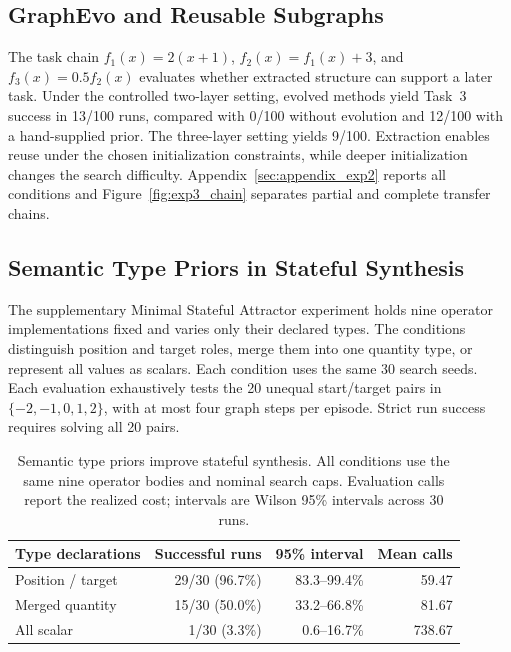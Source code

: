\subsection{GraphEvo and Reusable Subgraphs}
\label{subsec:graphevo_validation}
The task chain $f_1(x)=2(x+1)$, $f_2(x)=f_1(x)+3$, and $f_3(x)=0.5f_2(x)$ evaluates whether extracted structure can support a later task. Under the controlled two-layer setting, evolved methods yield Task~3 success in 13/100 runs, compared with 0/100 without evolution and 12/100 with a hand-supplied prior. The three-layer setting yields 9/100. Extraction enables reuse under the chosen initialization constraints, while deeper initialization changes the search difficulty. Appendix~\ref{sec:appendix_exp2} reports all conditions and Figure~\ref{fig:exp3_chain} separates partial and complete transfer chains.

\subsection{Semantic Type Priors in Stateful Synthesis}
\label{subsec:stateful_synthesis}
The supplementary Minimal Stateful Attractor experiment holds nine operator implementations fixed and varies only their declared types. The conditions distinguish position and target roles, merge them into one quantity type, or represent all values as scalars. Each condition uses the same 30 search seeds. Each evaluation exhaustively tests the 20 unequal start/target pairs in $\{-2,-1,0,1,2\}$, with at most four graph steps per episode. Strict run success requires solving all 20 pairs.

\begin{table}[t]
\centering
\caption{Semantic type priors improve stateful synthesis. All conditions use the same nine operator bodies and nominal search caps. Evaluation calls report the realized cost; intervals are Wilson 95\% intervals across 30 runs.}
\label{tab:revision_type_main}
\small
\begin{tabular}{lrrr}
\toprule
Type declarations & Successful runs & 95\% interval & Mean calls \\
\midrule
Position / target & 29/30 (96.7\%) & 83.3--99.4\% & 59.47 \\
Merged quantity & 15/30 (50.0\%) & 33.2--66.8\% & 81.67 \\
All scalar & 1/30 (3.3\%) & 0.6--16.7\% & 738.67 \\
\bottomrule
\end{tabular}
\end{table}

